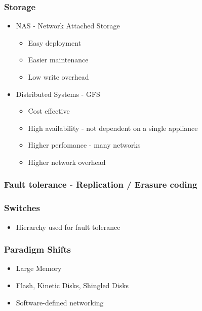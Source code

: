 \documentclass[a4paper]{article}
\begin{document}
\subsubsection{Storage}

\begin{itemize}
\item
    NAS - Network Attached Storage

    \begin{itemize}
        \item
        Easy deployment
    \item
        Easier maintenance
    \item
        Low write overhead
    \end{itemize}
\item
    Distributed Systems - GFS

    \begin{itemize}
        \item
        Cost effective
    \item
        High availability - not dependent on a single appliance
    \item
        Higher perfomance - many networks
    \item
        Higher network overhead
    \end{itemize}
\end{itemize}

\subsubsection{Fault tolerance - Replication / Erasure coding}

\subsubsection{Switches}

\begin{itemize}
\item
    Hierarchy used for fault tolerance
\end{itemize}

\subsubsection{Paradigm Shifts}

\begin{itemize}
\item
    Large Memory
\item
    Flash, Kinetic Disks, Shingled Disks
\item
    Software-defined networking
\end{itemize}
\end{document}
